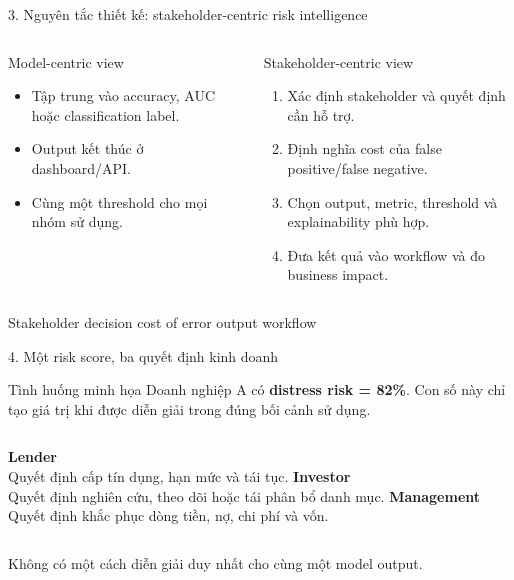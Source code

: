 \documentclass[aspectratio=169,11pt]{beamer}
\newcommand{\bad}[1]{\textcolor{fdred}{\textbf{#1}}}
\begin{document}
\begin{frame}{3. Nguyên tắc thiết kế: stakeholder-centric risk intelligence}
  \begin{columns}[T,totalwidth=\textwidth]
      \begin{block}{Model-centric view}
        \begin{itemize}
          \item Tập trung vào accuracy, AUC hoặc classification label.
          \item Output kết thúc ở dashboard/API.
          \item Cùng một threshold cho mọi nhóm sử dụng.
        \end{itemize}
      \end{block}
      \begin{exampleblock}{Stakeholder-centric view}
        \begin{enumerate}
          \item Xác định stakeholder và quyết định cần hỗ trợ.
          \item Định nghĩa cost của false positive/false negative.
          \item Chọn output, metric, threshold và explainability phù hợp.
          \item Đưa kết quả vào workflow và đo business impact.
        \end{enumerate}
      \end{exampleblock}
  \end{columns}
  \vfill
  \centering\large Stakeholder \textrightarrow{} decision \textrightarrow{} cost of error \textrightarrow{} output \textrightarrow{} workflow
\end{frame}

\begin{frame}{4. Một risk score, ba quyết định kinh doanh}
  \begin{alertblock}{Tình huống minh họa}
    Doanh nghiệp A có \bad{distress risk = 82\%}. Con số này chỉ tạo giá trị khi được diễn giải trong đúng bối cảnh sử dụng.
  \end{alertblock}
  \vspace{.4em}
  \begin{columns}[T,totalwidth=\textwidth]
      \centering\textcolor{fdblue}{\Large\textbf{Lender}}\\
      \vspace{.3em}\small Quyết định cấp tín dụng, hạn mức và tái tục.
      \centering\textcolor{fdteal}{\Large\textbf{Investor}}\\
      \vspace{.3em}\small Quyết định nghiên cứu, theo dõi hoặc tái phân bổ danh mục.
      \centering\textcolor{fdorange}{\Large\textbf{Management}}\\
      \vspace{.3em}\small Quyết định khắc phục dòng tiền, nợ, chi phí và vốn.
  \end{columns}
  \vfill
  \centering\small\textcolor{fdink!70}{Không có một cách diễn giải duy nhất cho cùng một model output.}
\end{frame}
\end{document}
